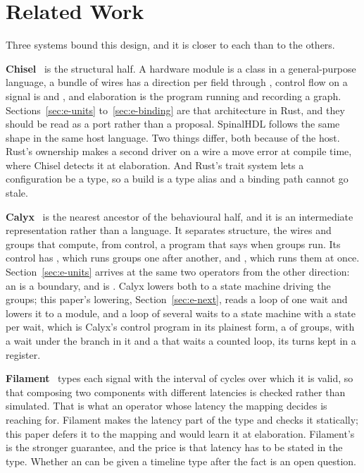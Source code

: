 \section{Related Work}
\label{sec:e-related}

Three systems bound this design, and it is closer to each than to the
others.

\textbf{Chisel}~\cite{bachrach2012} is the structural half. A hardware
module is a class in a general-purpose language, a bundle of wires has a
direction per field through , control flow on a signal is
 and , and elaboration is the program running and
recording a graph. Sections~\ref{sec:e-units} to~\ref{sec:e-binding} are
that architecture in Rust, and they should be read as a port rather than
a proposal. SpinalHDL follows the same shape in the same host language.
Two things differ, both because of the host. Rust's ownership makes a
second driver on a wire a move error at compile time, where Chisel
detects it at elaboration. And Rust's trait system lets a configuration be
a type, so a build is a type alias and a binding path cannot go stale.

\textbf{Calyx}~\cite{calyx} is the nearest ancestor of the behavioural
half, and it is an intermediate representation rather than a language.
It separates structure, the wires and groups that compute, from control,
a program that says when groups run. Its control has , which
runs groups one after another, and , which runs them at once.
Section~\ref{sec:e-units} arrives at the same two operators from the other
direction: an  is a  boundary, and
 is . Calyx lowers both to a state machine
driving the groups; this paper's lowering, Section~\ref{sec:e-next},
reads a loop of one wait and lowers it to a module, and a loop of
several waits to a state machine with a state per wait, which is
Calyx's control program in its plainest form, a  of groups,
with a wait under  the branch in it and a  that
waits a counted loop, its turns kept in a register.

\textbf{Filament}~\cite{filament} types each signal with the interval of
cycles over which it is valid, so that composing two components with
different latencies is checked rather than simulated. That is what an
 operator whose latency the mapping decides is reaching for.
Filament makes the latency part of the type and checks it statically;
this paper defers it to the mapping and would learn it at elaboration.
Filament's is the stronger guarantee, and the price is that latency has
to be stated in the type. Whether an  can be given a
timeline type after the fact is an open question.

